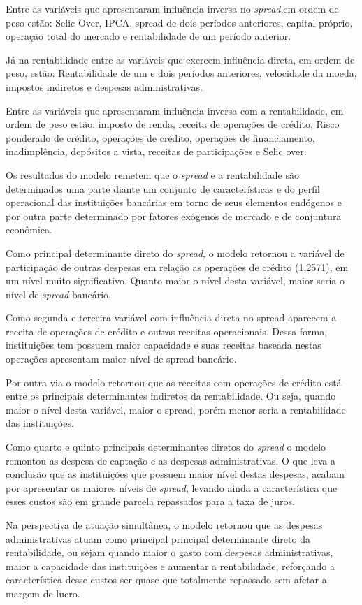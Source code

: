 \documentclass[
  12pt,
  12pt,
  openright,
  oneside,
  a4paper,
  chapter=TITLE,
  section=TITLE,
  subsection=TITLE,
  subsubsection=TITLE,
  english,
  portugues,
  sumario=tradicional]{abntex2}
\begin{document}
Entre as variáveis que apresentaram influência inversa no \emph{spread},em ordem de peso estão: Selic Over, IPCA, spread de dois períodos anteriores, capital próprio, operação total do mercado e rentabilidade de um período anterior.

Já na rentabilidade entre as variáveis que exercem influência direta, em ordem de peso, estão: Rentabilidade de um e dois períodos anteriores, velocidade da moeda, impostos indiretos e despesas administrativas.

Entre as variáveis que apresentaram influência inversa com a rentabilidade, em ordem de peso estão: imposto de renda, receita de operações de crédito, Risco ponderado de crédito, operações de crédito, operações de financiamento, inadimplência, depósitos a vista, receitas de participações e Selic over.

Os resultados do modelo remetem que o \emph{spread} e a rentabilidade são determinados uma parte diante um conjunto de características e do perfil operacional das instituições bancárias em torno de seus elementos endógenos e por outra parte determinado por fatores exógenos de mercado e de conjuntura econômica.

Como principal determinante direto do \emph{spread}, o modelo retornou a variável de participação de outras despesas em relação as operações de crédito (1,2571), em um nível muito significativo. Quanto maior o nível desta variável, maior seria o nível de \emph{spread} bancário.

Como segunda e terceira variável com influência direta no spread aparecem a receita de operações de crédito e outras receitas operacionais. Dessa forma, instituições tem possuem maior capacidade e suas receitas baseada nestas operações apresentam maior nível de spread bancário.

Por outra via o modelo retornou que as receitas com operações de crédito está entre os principais determinantes indiretos da rentabilidade. Ou seja, quando maior o nível desta variável, maior o spread, porém menor seria a rentabilidade das instituições.

Como quarto e quinto principais determinantes diretos do \emph{spread} o modelo remontou as despesa de captação e as despesas administrativas. O que leva a conclusão que as instituições que possuem maior nível destas despesas, acabam por apresentar os maiores níveis de \emph{spread}, levando ainda a característica que esses custos são em grande parcela repassados para a taxa de juros.

Na perspectiva de atuação simultânea, o modelo retornou que as despesas administrativas atuam como principal principal determinante direto da rentabilidade, ou sejam quando maior o gasto com despesas administrativas, maior a capacidade das instituições e aumentar a rentabilidade, reforçando a característica desse custos ser quase que totalmente repassado sem afetar a margem de lucro.
\end{document}
